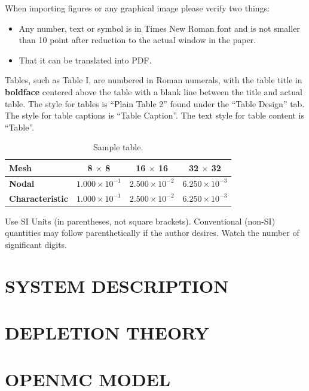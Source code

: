 \documentclass[letterpaper]{physor2024}
\begin{document}
When importing figures or any graphical image please verify two things:
\begin{itemize}
    \item Any number, text or symbol is in Times New Roman font and is not smaller than 10 point after reduction to the actual window in the paper.
    \item That it can be translated into PDF.
\end{itemize}

Tables, such as Table I, are numbered in Roman numerals, with the table title in \textbf{boldface} centered above the table with a blank line between the title and actual table. The style for tables is ``Plain Table 2'' found under the ``Table Design'' tab. The style for table captions is ``Table Caption''. The text style for table content is ``Table''.

\begin{table}[h!]
    \centering
    \caption{Sample table.}
    \begin{tabular}{|l|c|c|c|}
        \hline
         \textbf{Mesh}           & \textbf{8 $\times$ 8} & \textbf{16 $\times$ 16} & \textbf{32 $\times$ 32} \\ \hline
         \textbf{Nodal}          & $1.000\times 10^{-1}$ & $2.500\times 10^{-2}$ & $6.250\times 10^{-3}$ \\ \hline
         \textbf{Characteristic} & $1.000\times 10^{-1}$ & $2.500\times 10^{-2}$ & $6.250\times 10^{-3}$ \\ \hline
    \end{tabular}

    \label{tab:sample}
\end{table}

Use SI Units (in parentheses, not square brackets).  Conventional (non-SI) quantities may follow parenthetically if the author desires.  Watch the number of significant digits.

\section{SYSTEM DESCRIPTION}

\section{DEPLETION THEORY}

\section{OPENMC MODEL}
\end{document}
